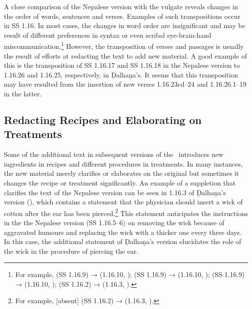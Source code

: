 A close comparison of the Nepalese version with the vulgate reveals changes in the 
order of words, sentences and verses. Examples of such transpositions occur in SS 1.16. 
In 
most cases, the changes in word order are insignificant and may be result of different 
preferences in syntax or even scribal eye-brain-hand miscommunication.\footnote{For 
example,  (SS 1.16.9) →  (1.16.10, \cite[77]{vulgate}); 
 (SS 1.16.9) →  (1.16.10, 
\cite[77]{vulgate});  (SS 1.16.9) → 
 (1.16.10, \cite[77]{vulgate}); 
(SS 1.16.2) →  (1.16.3, \cite[76]{vulgate}).} However, the transposition of verses and 
passages is usually the result of efforts at redacting the text to add new material. A good 
example of this is the transposition of SS 1.16.17 and SS 1.16.18 in the Nepalese version 
to 
1.16.26 and 1.16.25, respectively, in Ḍalhaṇa's. It seems that this transposition may have 
resulted from the insertion of new verses 1.16.23cd–24 and 1.16.26.1–19 in the latter.


%
\subsection{Redacting Recipes and Elaborating on Treatments}

Some of the additional text in subsequent versions of the \SS\ introduces new
ingredients in recipes and different procedures in treatments. In many instances,
the new material merely clarifies or elaborates on the original but sometimes it
changes the recipe or treatment significantly. An example of a suppletion that
clarifies the text of the Nepalese version can be seen in 1.16.3 of Ḍalhaṇa's
version (\cite[76]{vulgate}), which contains a statement that the physician should
insert a wick of cotton after the ear has been pierced.\footnote{For example,
    [absent] (SS 1.16.2) →  (1.16.3, \cite[76]{vulgate}).}
    This statement anticipates the instructions in the the Nepalese version
    (SS 1.16.5–6) on removing the wick because of aggravated humours and replacing the
    wick with a thicker one every three days. In this case, the additional statement
    of Ḍalhaṇa's version elucidates the role of the wick in the procedure of piercing
    the ear.

